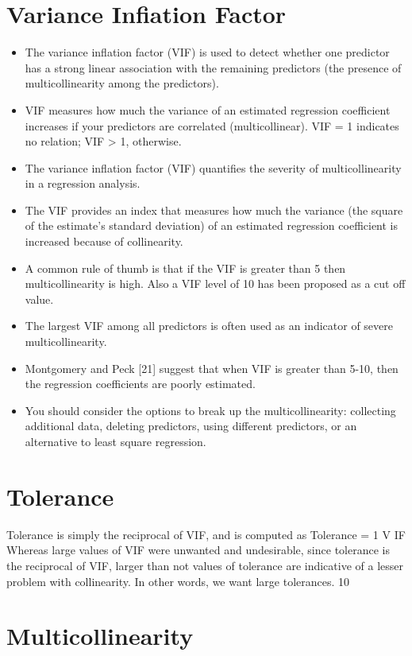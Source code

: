 \documentclass[]{report}
\begin{document}
\section*{Variance Infiation Factor}
\begin{itemize}
	\item  The variance inflation factor (VIF) is used to detect whether one predictor has a strong linear association
	with the remaining predictors (the presence of multicollinearity among the predictors).
	\item  VIF measures how much the variance of an estimated regression coefficient increases if your predictors
	are correlated (multicollinear). VIF = 1 indicates no relation; VIF > 1, otherwise.
	
	\item  The variance inflation factor (VIF) quantifies the severity of multicollinearity in a regression analysis.
	\item  The VIF provides an index that measures how much the variance (the square of the estimate's standard
	deviation) of an estimated regression coefficient is increased because of collinearity.
	\item  A common rule of thumb is that if the VIF is greater than 5 then multicollinearity is high. Also a VIF
	level of 10 has been proposed as a cut off value.
	\item  The largest VIF among all predictors is often used as an indicator of severe multicollinearity.
	\item  Montgomery and Peck [21] suggest that when VIF is greater than 5-10, then the regression coefficients are poorly estimated.
	\item  You should consider the options to break up the multicollinearity: collecting additional data, deleting predictors, using different predictors, or 
	an alternative to least square regression.
\end{itemize}

\section{Tolerance}
Tolerance is simply the reciprocal of VIF, and is computed as
Tolerance =
1
V IF
Whereas large values of VIF were unwanted and undesirable, since tolerance is the reciprocal of VIF, larger
than not values of tolerance are indicative of a lesser problem with collinearity. In other words, we want large
tolerances.
10
\newpage
\section{Multicollinearity}
\end{document}

